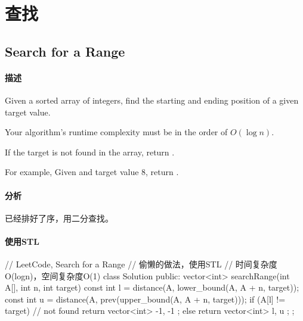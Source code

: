 \chapter{查找}


\section{Search for a Range} %
\label{sec:search-for-a-range}


\subsubsection{描述}
Given a sorted array of integers, find the starting and ending position of a given target value.

Your algorithm's runtime complexity must be in the order of $O(\log n)$.

If the target is not found in the array, return \code{[-1, -1]}.

For example,
Given \code{[5, 7, 7, 8, 8, 10]} and target value 8,
return \code{[3, 4]}.


\subsubsection{分析}
已经排好了序，用二分查找。


\subsubsection{使用STL}
\begin{Code}
// LeetCode, Search for a Range
// 偷懒的做法，使用STL
// 时间复杂度O(logn)，空间复杂度O(1)
class Solution {
public:
    vector<int> searchRange(int A[], int n, int target) {
        const int l = distance(A, lower_bound(A, A + n, target));
        const int u = distance(A, prev(upper_bound(A, A + n, target)));
        if (A[l] != target) // not found
            return vector<int> { -1, -1 };
        else
            return vector<int> { l, u };
    }
};
\end{Code}


